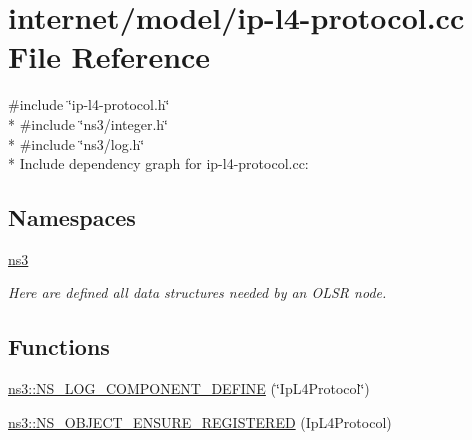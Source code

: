 \hypertarget{ip-l4-protocol_8cc}{}\section{internet/model/ip-\/l4-\/protocol.cc File Reference}
\label{ip-l4-protocol_8cc}
{\ttfamily \#include \char`\"{}ip-\/l4-\/protocol.\+h\char`\"{}}\\*
{\ttfamily \#include \char`\"{}ns3/integer.\+h\char`\"{}}\\*
{\ttfamily \#include \char`\"{}ns3/log.\+h\char`\"{}}\\*
Include dependency graph for ip-\/l4-\/protocol.cc\+:
\subsection*{Namespaces}
\begin{DoxyCompactItemize}
\item 
 \hyperlink{namespacens3}{ns3}
\begin{DoxyCompactList}\small\item\em Here are defined all data structures needed by an O\+L\+SR node. \end{DoxyCompactList}\end{DoxyCompactItemize}
\subsection*{Functions}
\begin{DoxyCompactItemize}
\item 
\hyperlink{namespacens3_a987c655660acc96d866a2d69b80f2208}{ns3\+::\+N\+S\+\_\+\+L\+O\+G\+\_\+\+C\+O\+M\+P\+O\+N\+E\+N\+T\+\_\+\+D\+E\+F\+I\+NE} (\char`\"{}Ip\+L4\+Protocol\char`\"{})
\item 
\hyperlink{namespacens3_af28b12fe7542168c0f5a34bf8a2f9091}{ns3\+::\+N\+S\+\_\+\+O\+B\+J\+E\+C\+T\+\_\+\+E\+N\+S\+U\+R\+E\+\_\+\+R\+E\+G\+I\+S\+T\+E\+R\+ED} (Ip\+L4\+Protocol)
\end{DoxyCompactItemize}
